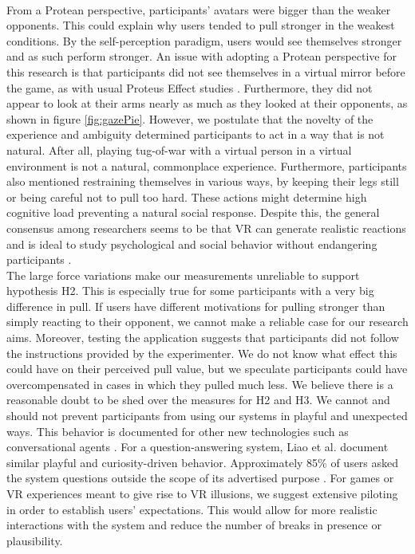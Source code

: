 \\
 From a Protean perspective, participants' avatars were bigger than the weaker opponents. This could explain why users tended to pull stronger in the weakest conditions. By the self-perception paradigm, users would see themselves stronger and as such perform stronger. An issue with adopting a Protean perspective for this research is that participants did not see themselves in a virtual mirror before the game, as with usual Proteus Effect studies \cite{bailenson2006transformed}. Furthermore, they did not appear to look at their arms nearly as much as they looked at their opponents, as shown in figure \ref{fig:gazePie}. However, we postulate that the novelty of the experience and ambiguity determined participants to act in a way that is not natural. After all, playing tug-of-war with a virtual person in a virtual environment is not a natural, commonplace experience. Furthermore, participants also mentioned restraining themselves in various ways, by keeping their legs still or being careful not to pull too hard. These actions might determine high cognitive load preventing a natural social response. Despite this, the general consensus among researchers seems to be that VR can generate realistic reactions and is ideal to study psychological and social behavior without endangering participants \cite{fox2009virtual}.
 \\
The large force variations make our measurements unreliable to support hypothesis H2. This is especially true for some participants with a very big difference in pull. If users have different motivations for pulling stronger than simply reacting to their opponent, we cannot make a reliable case for our research aims. Moreover, testing the application suggests that participants did not follow the instructions provided by the experimenter. We do not know what effect this could have on their perceived pull value, but we speculate participants could have overcompensated in cases in which they pulled much less. We believe there is a reasonable doubt to be shed over the measures for H2 and H3. We cannot and should not prevent participants from using our systems in playful and unexpected ways. This behavior is documented for other new technologies such as conversational agents \cite{jain2018evaluating}. For a question-answering system, Liao et al. document similar playful and curiosity-driven behavior. Approximately 85\% of users asked the system questions outside the scope of its advertised purpose \cite{liao2018all}. For games or VR experiences meant to give rise to VR illusions, we suggest extensive piloting in order to establish users' expectations. This would allow for more realistic interactions with the system and reduce the number of breaks in presence or plausibility.  

